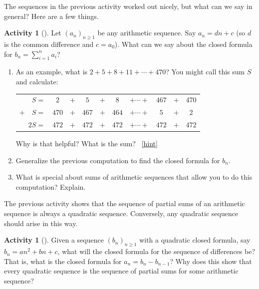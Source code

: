 \documentclass[10pt,]{book}
\theoremstyle{plain}
\theoremstyle{definition}
\theoremstyle{definition}
\theoremstyle{definition}
\newtheorem{activity}[project]{Activity}
\numberwithin{equation}{chapter}
\newcommand{\hrulethin}  {\noalign{\hrule height 0.04em}}
\begin{document}
\hypertarget{p-505}{}%
The sequences in the previous activity worked out nicely, but what can we say in general?  Here are a few things.%
\begin{activity}[]\label{activity-84}
\hypertarget{p-506}{}%
Let \((a_n)_{n \ge 1}\) be any arithmetic sequence.  Say \(a_n = dn + c\) (so \(d\) is the common difference and \(c = a_0\)).  What can we say about the closed formula for \(b_n = \sum_{i=1}^n a_i\)?%
\begin{enumerate}[font=\bfseries,label=(\alph*),ref=\alph*]
\item\label{task-108} \hypertarget{p-507}{}%
As an example, what is \(2+5+8+11+\cdots + 470\)?  You might call this sum \(S\) and calculate:%
\begin{sidebyside}{1}{0}{0}{0}
\begin{sbspanel}{1}
{\centering%
\begin{tabular}{rccccccccc}
\(S  =\)&\(2\)&\(+\)&\(5\)&\(+\)&\(8\)&\(+ \cdots +\)&\(467\)&\(+\)&470\tabularnewline[0pt]
\(+ \quad S  =\)&\(470\)&\(+\)&\(467\)&\(+\)&\(464\)&\(+ \cdots +\)&\(5\)&\(+\)&2\tabularnewline\hrulethin
\(2S  =\)&\(472\)&\(+\)&\(472\)&\(+\)&\(472\)&\(+ \cdots +\)&\(472\)&\(+\)&\(472\)
\end{tabular}
\par}
\end{sbspanel}
\end{sidebyside}
\par
\hypertarget{p-508}{}%
Why is that helpful?  What is the sum?%
~\hfill{\tiny\hyperlink{a-84.a}{[hint]}\hypertarget{q-84.a}{}}\item\label{task-109} \hypertarget{p-510}{}%
Generalize the previous computation to find the closed formula for \(b_n\).%
\item\label{task-110} \hypertarget{p-511}{}%
What is special about sums of arithmetic sequences that allow you to do this computation?  Explain.%
\end{enumerate}
\end{activity}
\hypertarget{p-512}{}%
The previous activity shows that the sequence of partial sums of an arithmetic sequence is always a quadratic sequence.  Conversely, any quadratic sequence should arise in this way.%
\begin{activity}[]\label{activity-85}
\hypertarget{p-513}{}%
Given a sequence \((b_n)_{n \ge 1}\) with a quadratic closed formula, say \(b_n = an^2 + bn + c\), what will the closed formula for the sequence of differences be?  That is, what is the closed formula for \(a_n = b_n - b_{n-1}\)?  Why does this show that every quadratic sequence is the sequence of partial sums for some arithmetic sequence?%
\end{activity}
\end{document}
